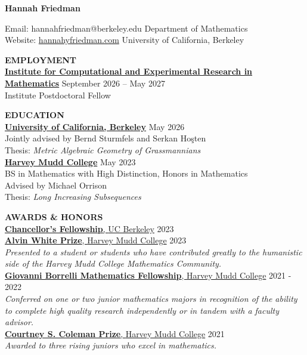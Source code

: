 \documentclass[11pt]{article}
\newcommand{\hdr}[1]{\textcolor{blue(ryb)}{\textbf{#1}}}
\newcommand{\role}[3]{\underline{\textbf{#1}, {#2}} \hfill #3}
\begin{document}
\begin{center}
\hdr{\Large{Hannah Friedman}}\\
\end{center}
Email: hannahfriedman@berkeley.edu \hfill Department of Mathematics\\
Website: \url{hannahyfriedman.com} \hfill University of California, Berkeley

\bigskip
\raggedright
\hdr{EMPLOYMENT}\\
\textbf{\underline{Institute for Computational and Experimental Research in Mathematics}} \hfill September 2026 -- May 2027\\
Institute Postdoctoral Fellow

\bigskip

\hdr{EDUCATION}\\
\textbf{\underline{University of California, Berkeley}} \hfill May 2026\\
Jointly advised by Bernd Sturmfels and Serkan Ho\c{s}ten\\
Thesis: \emph{Metric Algebraic Geometry of Grassmannians}\\
\textbf{\underline{Harvey Mudd College}} \hfill May 2023\\
BS in Mathematics with High Distinction, Honors in Mathematics\\
Advised by Michael Orrison\\
Thesis: \emph{Long Increasing Subsequences}

\bigskip

\hdr{AWARDS \& HONORS}\\
\role{Chancellor's Fellowship}{UC Berkeley}{2023}\\
\role{Alvin White Prize}{Harvey Mudd College}{2023}\\
\textit{Presented to a student or students who have contributed greatly to the humanistic side of the Harvey Mudd College Mathematics Community.}\\
\role{Giovanni Borrelli Mathematics Fellowship}{Harvey Mudd College}{2021 - 2022}\\
\textit{Conferred on one or two junior mathematics majors in recognition of the ability to complete high quality research independently or in tandem with a faculty advisor.}\\
\role{Courtney S. Coleman Prize}{Harvey Mudd College}{2021}\\
\textit{Awarded to three rising juniors who excel in mathematics.}

\bigskip
\end{document}
